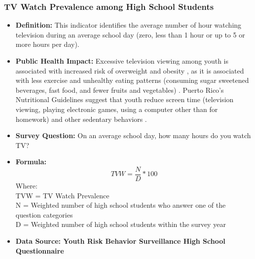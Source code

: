 \documentclass[12pt,letterpaper]{report}
\begin{document}
		\subsubsection{TV Watch Prevalence among High School Students} 
	\begin{itemize}
		\item \textbf{Definition:} This indicator identifies the average number of hour watching television during an average school day (zero, less than 1 hour or up to 5 or more hours per day). 
		
		\item \textbf{Public Health Impact:} Excessive television viewing among youth is associated with increased risk of overweight and obesity \cite{salmon2006television}, as it is associated with less exercise and unhealthy eating patterns (consuming sugar sweetened beverages, fast food, and fewer fruits and vegetables) \cite{coon2001relationships}. Puerto Rico's Nutritional Guidelines suggest that youth reduce screen time (television viewing, playing electronic games, using a computer other than for homework) and other sedentary behaviors \cite{GuiaAlimentariaPR}.
		\item \textbf{Survey Question:} On an average school day, how many hours do you watch TV?
		\item \textbf{Formula:} 
			\begin{equation}
				TVW = \frac{N}{D} * 100
			\end{equation}
Where: \\
			TVW = TV Watch Prevalence \\
			
			N = Weighted number of high school students who answer one of the question categories \\
			
			D = Weighted number of high school students within the survey year \\
			
		\item \textbf{Data Source: Youth Risk Behavior Surveillance High School Questionnaire}
	\end{itemize}

\end{document}
